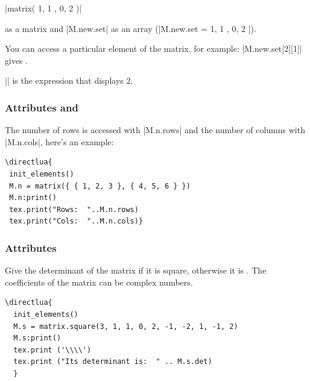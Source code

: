|matrix({ { 1, 1 }, { 0, 2 } })|

 as a matrix and |M.new.set| as an array (|M.new.set = { { 1, 1 }, {0, 2 } }|).

You can access a particular element of the matrix, for example: |M.new.set[2][1]| gives .

|| is the expression that displays $2$.

\subsubsection{Attributes  and }
\label{ssub:attributes_matrix_rows_and_cols}

The number of rows is accessed with |M.n.rows| and the number of columns with |M.n.cols|, here's an example:

\vspace{.5em}
\begin{minipage}{.5\textwidth}
\begin{verbatim}
\directlua{
 init_elements()
 M.n = matrix({ { 1, 2, 3 }, { 4, 5, 6 } })
 M.n:print()
 tex.print("Rows:  "..M.n.rows)
 tex.print("Cols:  "..M.n.cols)}
\end{verbatim}
\end{minipage}
\begin{minipage}{.5\textwidth}
\end{minipage}

\subsubsection{Attributes  }
\label{ssub:attributes_matrix_det}
Give the determinant of the matrix if it is square, otherwise it is . The coefficients of the matrix can be complex numbers.

\vspace{.5em}
\begin{minipage}{.6\textwidth}
\begin{verbatim}
\directlua{
  init_elements()
  M.s = matrix.square(3, 1, 1, 0, 2, -1, -2, 1, -1, 2)
  M.s:print()
  tex.print ('\\\\')
  tex.print ("Its determinant is:  " .. M.s.det)
  }
\end{verbatim}
\end{minipage}
\begin{minipage}{.4\textwidth}
\end{minipage}

